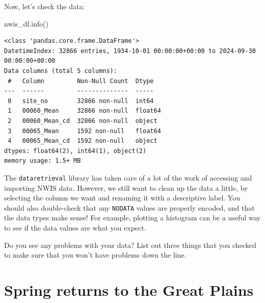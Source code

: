 \documentclass[
  letterpaper,
  DIV=11,
  numbers=noendperiod,
  oneside]{scrreprt}
\newenvironment{Shaded}{\begin{snugshade}}{\end{snugshade}}
\newcommand{\NormalTok}[1]{\textcolor[rgb]{0.00,0.23,0.31}{#1}}
\begin{document}
Now, let's check the data:

\begin{Shaded}
\begin{Highlighting}[]
\NormalTok{nwis\_df.info()}
\end{Highlighting}
\end{Shaded}

\begin{verbatim}
<class 'pandas.core.frame.DataFrame'>
DatetimeIndex: 32866 entries, 1934-10-01 00:00:00+00:00 to 2024-09-30 00:00:00+00:00
Data columns (total 5 columns):
 #   Column         Non-Null Count  Dtype  
---  ------         --------------  -----  
 0   site_no        32866 non-null  int64  
 1   00060_Mean     32866 non-null  float64
 2   00060_Mean_cd  32866 non-null  object 
 3   00065_Mean     1592 non-null   float64
 4   00065_Mean_cd  1592 non-null   object 
dtypes: float64(2), int64(1), object(2)
memory usage: 1.5+ MB
\end{verbatim}

The \texttt{dataretrieval} library has taken care of a lot of the work
of accessing and importing NWIS data. However, we still want to clean up
the data a little, by selecting the column we want and renaming it with
a descriptive label. You should also double-check that any
\texttt{NODATA} values are properly encoded, and that the data types
make sense! For example, plotting a histogram can be a useful way to see
if the data values are what you expect.

\begin{tcolorbox}[enhanced jigsaw, colbacktitle=quarto-callout-color!10!white, opacityback=0, bottomtitle=1mm, toptitle=1mm, bottomrule=.15mm, left=2mm, colframe=quarto-callout-color-frame, leftrule=.75mm, opacitybacktitle=0.6, colback=white, rightrule=.15mm, toprule=.15mm, breakable, titlerule=0mm, title=\textcolor{quarto-callout-color}{\faInfo}\hspace{0.5em}{Reflect and Respond}, coltitle=black, arc=.35mm]

Do you see any problems with your data? List out three things that you
checked to make sure that you won't have problems down the line.

\end{tcolorbox}


\chapter{Spring returns to the Great
Plains}\label{spring-returns-to-the-great-plains}
\end{document}
